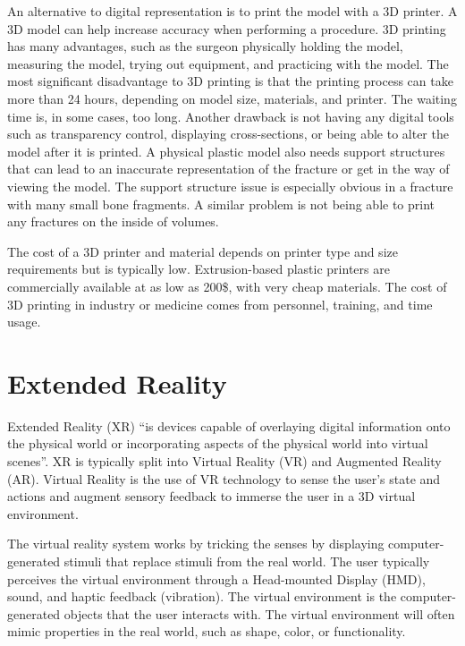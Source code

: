 \documentclass[a4paper]{report}
\begin{document}
An alternative to digital representation is to print the model with a 3D printer. A 3D model can help increase accuracy when performing a procedure\cite{shahrubudin_overview_2019}. 3D printing has many advantages, such as the surgeon physically holding the model, measuring the model, trying out equipment, and practicing with the model.
The most significant disadvantage to 3D printing is that the printing process can take more than 24 hours, depending on model size, materials, and printer. The waiting time is, in some cases, too long. 
Another drawback is not having any digital tools such as transparency control, displaying cross-sections, or being able to alter the model after it is printed. 
A physical plastic model also needs support structures that can lead to an inaccurate representation of the fracture or get in the way of viewing the model. The support structure issue is especially obvious in a fracture with many small bone fragments. A similar problem is not being able to print any fractures on the inside of volumes.

The cost of a 3D printer and material depends on printer type and size requirements but is typically low. Extrusion-based plastic printers are commercially available at as low as 200\$, with very cheap materials. The cost of 3D printing in industry or medicine comes from personnel, training, and time usage\cite{shahrubudin_overview_2019}.


\section{Extended Reality}
Extended Reality (XR) \enquote{is devices capable of overlaying digital information onto the physical world or incorporating aspects of the physical world into virtual scenes}\cite{extended Reality in medical}.
XR is typically split into Virtual Reality (VR) and Augmented Reality (AR).
Virtual Reality is the use of VR technology to sense the user's state and actions and augment sensory feedback to immerse the user in a 3D virtual environment\cite{mihelj_virtual_2014}.

The virtual reality system works by tricking the senses by displaying computer-generated stimuli that replace stimuli from the real world. The user typically perceives the virtual environment through a Head-mounted Display (HMD), sound, and haptic feedback (vibration). 
The virtual environment is the computer-generated objects that the user interacts with. The virtual environment will often mimic properties in the real world, such as shape, color, or functionality.
\end{document}
